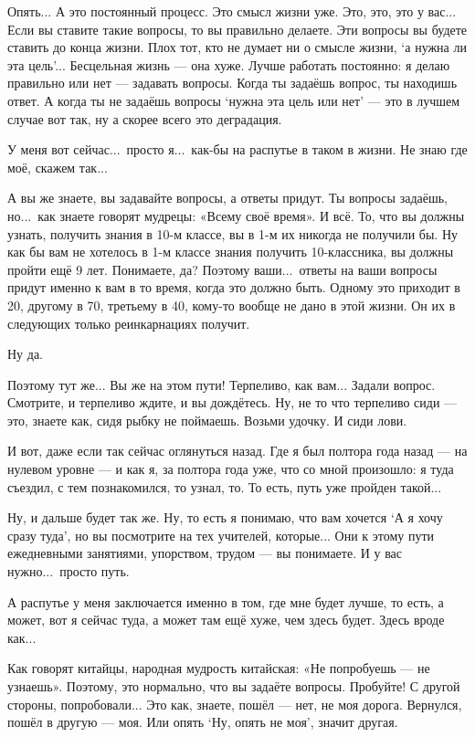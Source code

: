 \A
Опять...
А это постоянный процесс.
Это смысл жизни уже.
Это, это, это у вас...
Если вы ставите такие вопросы, то вы правильно делаете. Эти вопросы вы будете ставить
до конца жизни.
Плох тот, кто не думает ни о смысле жизни, `а нужна ли эта цель'...
Бесцельная жизнь --- она хуже.
Лучше работать постоянно: я делаю правильно или нет --- задавать вопросы.
Когда ты задаёшь вопрос, ты находишь ответ.
А когда ты не задаёшь вопросы `нужна эта цель или нет' --- это в лучшем случае вот
так, ну а скорее всего это деградация.

\I
У меня вот сейчас...\ просто я...\ как-бы на распутье в таком в жизни.
Не знаю где моё, скажем так...

\A
А вы же знаете, вы задавайте вопросы, а ответы придут.
Ты вопросы задаёшь, но...\ как знаете говорят мудрецы:
«Всему своё время». И всё. То, что вы должны узнать, получить знания в 10-м классе,
вы в 1-м их никогда не получили бы.
Ну как бы вам не хотелось в 1-м классе знания получить 10-классника, вы должны пройти ещё 9 лет.
Понимаете, да?
Поэтому ваши...\ ответы на ваши вопросы придут именно к вам в то время, когда это должно быть.
Одному это приходит в 20, другому в 70, третьему в 40, кому-то вообще не дано в этой жизни.
Он их в следующих только реинкарнациях получит.

\I
Ну да.

\A
Поэтому тут же... Вы же на этом пути!
Терпеливо, как вам...
Задали вопрос. Смотрите, и терпеливо ждите, и вы дождётесь.
Ну, не то что терпеливо сиди --- это, знаете как, сидя рыбку не поймаешь.
Возьми удочку.
И сиди лови.

\I
И вот, даже если так сейчас оглянуться назад.
Где я был полтора года назад --- на нулевом уровне --- и как я, за полтора года уже,
что со мной произошло: я туда съездил, с тем познакомился, то узнал, то.
То есть, путь уже пройден такой...

\A
Ну, и дальше будет так же.
Ну, то есть я понимаю, что вам хочется `А я хочу сразу туда', но вы посмотрите
на тех учителей, которые... Они к этому пути ежедневными
занятиями, упорством, трудом --- вы понимаете.
И у вас нужно...\ просто путь.

\I
А распутье у меня заключается именно в том, где мне будет лучше, то есть, а может, вот я
сейчас туда, а может там ещё хуже, чем здесь будет.
Здесь вроде как...

\A
Как говорят китайцы, народная мудрость китайская: «Не попробуешь --- не узнаешь».
Поэтому, это нормально, что вы задаёте вопросы. Пробуйте!
С другой стороны, попробовали... Это как, знаете, пошёл --- нет, не моя дорога.
Вернулся, пошёл в другую --- моя. Или опять `Ну, опять не моя', значит другая.

